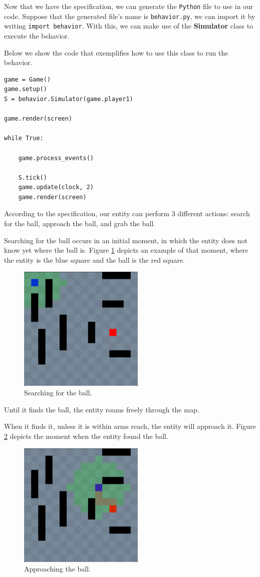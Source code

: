 \documentclass[a4paper,UKenglish,cleveref, autoref, thm-restate]{oasics-v2019}
\begin{document}
Now that we have the specification, we can generate the \texttt{Python} file to use in our code.
Suppose that the generated file's name is \texttt{behavior.py}, we can import it by writing \texttt{import behavior}.
With this, we can make use of the \textbf{Simulator} class to execute the behavior.

Below we show the code that exemplifies how to use this class to run the behavior.

\begin{lstlisting}
game = Game()
game.setup()
S = behavior.Simulator(game.player1)

game.render(screen)

while True:

    game.process_events()

    S.tick()
    game.update(clock, 2)
    game.render(screen)
\end{lstlisting}

According to the specification, our entity can perform 3 different actions: search for the ball, approach the ball, and grab the ball.

Searching for the ball occurs in an initial moment, in which the entity does not know yet where the ball is.
Figure \ref{fig:searching} depicts an example of that moment, where the entity is the blue square and the ball is the red square.
\begin{figure}
    \centering
    \includegraphics[width=6cm]{Searching.png}
    \caption{Searching for the ball.}
    \label{fig:searching}
\end{figure}

Until it finds the ball, the entity roams freely through the map.

When it finds it, unless it is within arms reach, the entity will approach it.
Figure \ref{fig:approaching} depicts the moment when the entity found the ball.
\begin{figure}
    \centering
    \includegraphics[width=6cm]{Approaching.png}
    \caption{Approaching the ball.}
    \label{fig:approaching}
\end{figure}
\end{document}
